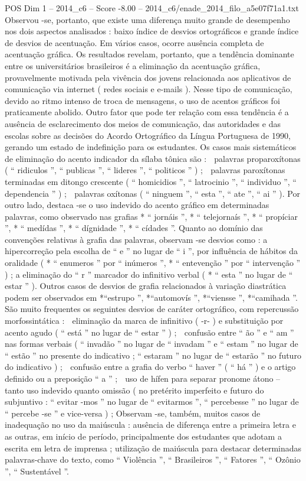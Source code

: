 \begin{textsample}{POS Dim 1 – 2014\_c6 – Score -8.00 – 2014\_c6/enade\_2014\_filo\_a5e07f71a1.txt}
Observou -se, portanto, que existe uma diferença muito grande de desempenho nos dois aspectos analisados : baixo índice de desvios ortográficos e grande índice de desvios de acentuação.
Em vários casos, ocorre ausência completa de acentuação gráfica.
Os resultados revelam, portanto, que a tendência dominante entre os universitários brasileiros é a eliminação da acentuação gráfica, provavelmente motivada pela vivência dos jovens relacionada aos aplicativos de comunicação via internet ( redes sociais e e-mails ).
Nesse tipo de comunicação, devido ao ritmo intenso de troca de mensagens, o uso de acentos gráficos foi praticamente abolido.
Outro fator que pode ter relação com essa tendência é a ausência de esclarecimento dos meios de comunicação, das autoridades e das escolas sobre as decisões do Acordo Ortográfico da Língua Portuguesa de 1990, gerando um estado de indefinição para os estudantes.
Os casos mais sistemáticos de eliminação do acento indicador da sílaba tônica são :  palavras proparoxítonas ( “ ridiculos ”, “ publicas ”, “ lideres ”, “ politicos ” ) ;  palavras paroxítonas terminadas em ditongo crescente ( “ homicidios ”, “ latrocinio ”, “ individuo ”, “ dependencia ” ) ;  palavras oxítonas ( “ ninguem ”, “ esta ”, “ ate ”, “ ai ” ).
Por outro lado, destaca -se o uso indevido do acento gráfico em determinadas palavras, como observado nas grafias * “ jornáis ”, * “ telejornaís ”, * “ propíciar ”, * “ medídas ”, * “ dígnidade ”, * “ cídades ”.
Quanto ao domínio das convenções relativas à grafia das palavras, observam -se desvios como : a hipercorreção pela escolha de “ e ” no lugar de “ i ”, por influência de hábitos da oralidade ( * “ enumeros ” por “ inúmeros ”, * “ entevenção ” por “ intervenção ” ) ; a eliminação do “ r ” marcador do infinitivo verbal ( * “ esta ” no lugar de “ estar ” ).
Outros casos de desvios de grafia relacionados à variação diastrática podem ser observados em *“estrupo ”, *“automovís ”, *“viensse ”, *“camihada ”.
São muito frequentes os seguintes desvios de caráter ortográfico, com repercussão morfossintática :  eliminação da marca de infinitivo ( -r- ) e substituição por acento agudo ( “ está ” no lugar de “ estar ” ) ;  confusão entre “ ão ” e “ am ” nas formas verbais ( “ invadão ” no lugar de “ invadam ” e “ estam ” no lugar de “ estão ” no presente do indicativo ; “ estaram ” no lugar de “ estarão ” no futuro do indicativo ) ;  confusão entre a grafia do verbo “ haver ” ( “ há ” ) e o artigo definido ou a preposição “ a ” ;  uso de hífen para separar pronome átono – tanto uso indevido quanto omissão ( no pretérito imperfeito e futuro do subjuntivo : “ evitar -mos ” no lugar de “ evitarmos ”, “ percebesse ” no lugar de “ percebe -se ” e vice-versa ) ; Observam -se, também, muitos casos de inadequação no uso da maiúscula : ausência de diferença entre a primeira letra e as outras, em início de período, principalmente dos estudantes que adotam a escrita em letra de imprensa ; utilização de maiúscula para destacar determinadas palavras-chave do texto, como “ Violência ”, “ Brasileiros ”, “ Fatores ”, “ Ozônio ”, “ Sustentável ”.

\end{textsample}
